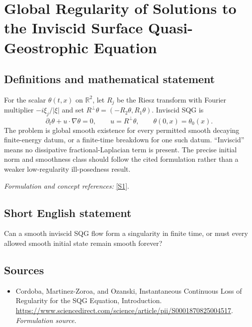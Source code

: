 \documentclass[11pt]{article}
\begin{document}
\section*{\texorpdfstring{Global Regularity of Solutions to the Inviscid Surface Quasi-Geostrophic Equation}{Global Regularity of Solutions to the Inviscid Surface Quasi-Geostrophic Equation}}\label{148}
\subsection{Definitions and mathematical statement}
For the scalar $\theta(t,x)$ on ${\mathbb{R}}^2$, let $R_j$ be the Riesz transform with Fourier multiplier $-i\xi_j/|\xi|$ and set $R^\perp\theta=(-R_2\theta,R_1\theta)$. Inviscid SQG is
\[
 \partial_t\theta+u\cdot\nabla\theta=0,\qquad u=R^\perp\theta,
 \qquad\theta(0,x)=\theta_0(x).
\]
The problem is global smooth existence for every permitted smooth decaying finite-energy datum, or a finite-time breakdown for one such datum. ``Inviscid'' means no dissipative fractional-Laplacian term is present. The precise initial norm and smoothness class should follow the cited formulation rather than a weaker low-regularity ill-posedness result.
\par\smallskip\textit{Formulation and concept references:} \href{https://www.sciencedirect.com/science/article/pii/S0001870825004517}{[S1]}.

\subsection{Short English statement}
Can a smooth inviscid SQG flow form a singularity in finite time, or must every allowed smooth initial state remain smooth forever?
\subsection{Sources}
\begin{itemize}
\item[S1]Cordoba, Martinez-Zoroa, and Ozanski, Instantaneous Continuous Loss of Regularity for the SQG Equation, Introduction.
\url{https://www.sciencedirect.com/science/article/pii/S0001870825004517}.
\textit{Formulation source.}
\end{itemize}
\end{document}
